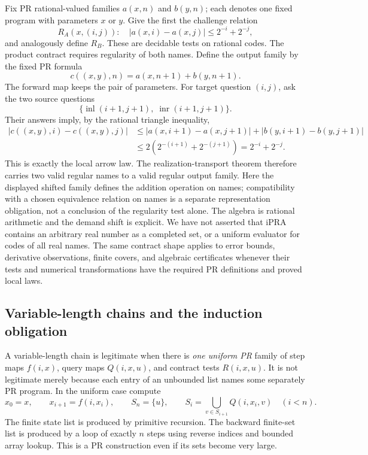 Fix PR rational-valued families $a(x,n)$ and $b(y,n)$; each denotes one fixed
program with parameters $x$ or $y$.  Give the first the challenge relation
\[
 R_A(x,(i,j)):\quad |a(x,i)-a(x,j)|\le 2^{-i}+2^{-j},
\]
and analogously define $R_B$.  These are decidable tests on rational codes.
The product contract requires regularity of both names.  Define the output
family by the fixed PR formula
\[
 c((x,y),n)=a(x,n+1)+b(y,n+1).
\]
The forward map keeps the pair of parameters.  For target question $(i,j)$,
ask the two source questions
\[
 \{\operatorname{inl}(i+1,j+1),\;
   \operatorname{inr}(i+1,j+1)\}.
\]
Their answers imply, by the rational triangle inequality,
\begin{align*}
 |c((x,y),i)-c((x,y),j)|
 &\le |a(x,i+1)-a(x,j+1)|+|b(y,i+1)-b(y,j+1)|\\
 &\le 2(2^{-(i+1)}+2^{-(j+1)})=2^{-i}+2^{-j}.
\end{align*}
This is exactly the local arrow law.  The realization-transport theorem
therefore carries two valid regular names to a valid regular output family.
Here the displayed shifted family defines the addition operation on names;
compatibility with a chosen equivalence relation on names is a separate
representation obligation, not a conclusion of the regularity test alone.
The algebra is rational arithmetic and the demand shift is explicit.  We have
not asserted that iPRA contains an arbitrary real number as a completed set,
or a uniform evaluator for codes of all real names.  The same contract shape
applies to error bounds, derivative observations, finite covers, and algebraic
certificates whenever their tests and numerical transformations have the
required PR definitions and proved local laws.

\subsection{Variable-length chains and the induction obligation}

A variable-length chain is legitimate when there is \emph{one uniform PR}
family of step maps $f(i,x)$, query maps $Q(i,x,u)$, and contract tests
$R(i,x,u)$.  It is not legitimate merely because each entry of an unbounded
list names some separately PR program.  In the uniform case compute
\[
 x_0=x,\qquad x_{i+1}=f(i,x_i),\qquad
 S_n=\{u\},\qquad
 S_i=\bigcup_{v\in S_{i+1}}Q(i,x_i,v)\quad(i<n).
\]
The finite state list is produced by primitive recursion.  The backward
finite-set list is produced by a loop of exactly $n$ steps using reverse
indices and bounded array lookup.  This is a PR construction even if its
sets become very large.


